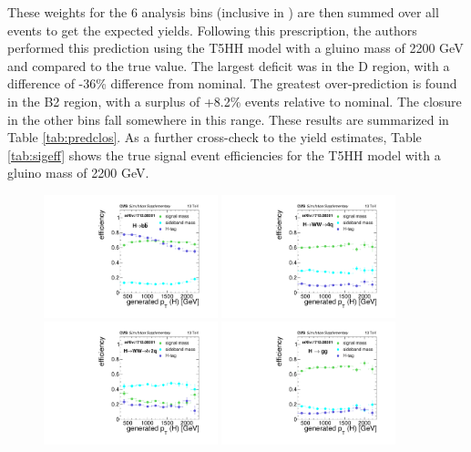 These weights for the 6 analysis bins (inclusive in \ptmiss) are then summed over all events to get the expected yields.
Following this prescription, the authors performed this prediction using the T5HH model with a gluino mass of 2200 GeV and compared to the true value.
The largest deficit was in the D region, with a difference of -36\% difference from nominal.
The greatest over-prediction is found in the B2 region, with a surplus of +8.2\% events relative to nominal.
The closure in the other bins fall somewhere in this range.
These results are summarized in Table \ref{tab:predclos}.
As a further cross-check to the yield estimates, Table \ref{tab:sigeff} shows the true signal event efficiencies for the T5HH model with a gluino mass of 2200 GeV.

\begin{figure}
\begin{centering}
\includegraphics[width=0.45\textwidth]{figs/SUS17006/CMS-SUS-17-006_Figure-aux_006.pdf}
\includegraphics[width=0.45\textwidth]{figs/SUS17006/CMS-SUS-17-006_Figure-aux_007.pdf}
\includegraphics[width=0.45\textwidth]{figs/SUS17006/CMS-SUS-17-006_Figure-aux_008.pdf}
\includegraphics[width=0.45\textwidth]{figs/SUS17006/CMS-SUS-17-006_Figure-aux_009.pdf}

\end{centering}
\end{figure}
